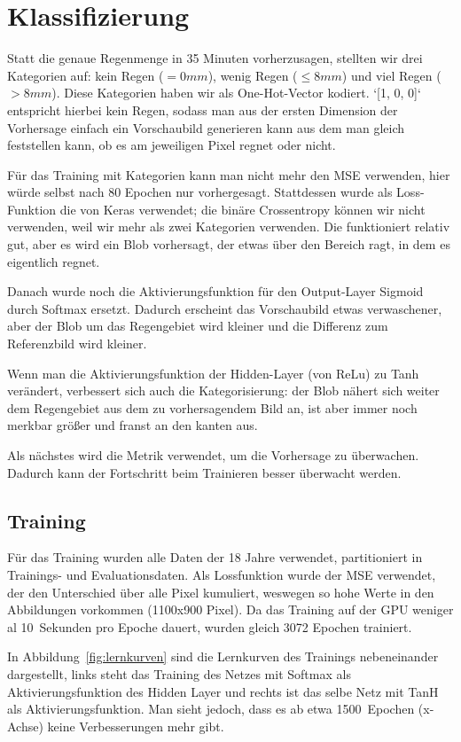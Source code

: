 \section{Klassifizierung}
Statt die genaue Regenmenge in 35 Minuten vorherzusagen, stellten wir drei Kategorien auf: kein Regen ($= 0mm$), wenig Regen ($\leq 8mm$) und viel Regen ($> 8mm$). Diese Kategorien haben wir als One-Hot-Vector kodiert. `[1, 0, 0]` entspricht hierbei kein Regen, sodass man aus der ersten Dimension der Vorhersage einfach ein Vorschaubild generieren kann aus dem man gleich feststellen kann, ob es am jeweiligen Pixel regnet oder nicht.

Für das Training mit Kategorien kann man nicht mehr den MSE verwenden, hier würde selbst nach 80 Epochen nur  vorhergesagt. Stattdessen wurde als Loss-Funktion die  von Keras verwendet; die binäre Crossentropy können wir nicht verwenden, weil wir mehr als zwei Kategorien verwenden. Die  funktioniert relativ gut, aber es wird ein Blob vorhersagt, der etwas über den Bereich ragt, in dem es eigentlich regnet.

Danach wurde noch die Aktivierungsfunktion für den Output-Layer Sigmoid durch Softmax ersetzt. Dadurch erscheint das Vorschaubild etwas verwaschener, aber der Blob um das Regengebiet wird kleiner und die Differenz zum Referenzbild wird kleiner.

Wenn man die Aktivierungsfunktion der Hidden-Layer (von ReLu) zu Tanh verändert, verbessert sich auch die Kategorisierung: der Blob nähert sich weiter dem Regengebiet aus dem zu vorhersagendem Bild an, ist aber immer noch merkbar größer und franst an den kanten aus.

Als nächstes wird die Metrik  verwendet, um die Vorhersage zu überwachen. Dadurch kann der Fortschritt beim Trainieren besser überwacht werden.


\subsection{Training}
Für das Training wurden alle Daten der 18 Jahre verwendet, partitioniert in Trainings- und Evaluationsdaten. Als Lossfunktion wurde der MSE verwendet, der den Unterschied über alle Pixel kumuliert, weswegen so hohe Werte in den Abbildungen vorkommen (1100x900 Pixel). Da das Training auf der GPU weniger al 10~Sekunden pro Epoche dauert, wurden gleich 3072 Epochen trainiert.

In Abbildung~\ref{fig:lernkurven} sind die Lernkurven des Trainings nebeneinander dargestellt, links steht das Training des Netzes mit Softmax als Aktivierungsfunktion des Hidden Layer und rechts ist das selbe Netz mit TanH als Aktivierungsfunktion. Man sieht jedoch, dass es ab etwa 1500~Epochen (x-Achse) keine Verbesserungen mehr gibt.

